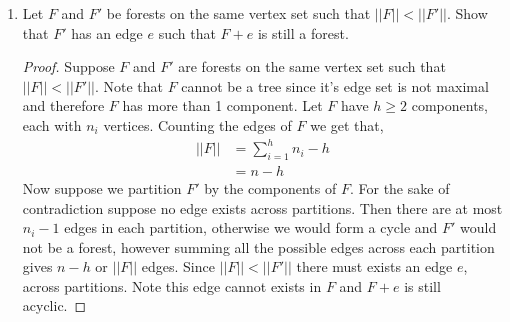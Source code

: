 \documentclass[12pt]{article}
\begin{document}
\begin{enumerate}
	\begin{proof}$(b \to d)$ Suppose any two vertices of $T$ are linked by a unique path. Let $x, y \in V(T)$ are non-adjacent and $P$ the unique path with which they are connected. Consider an edge $e$ incident to $x$ and $y$. Note $P + e$ will form a cycle in $T$, hence $T$ is maximally connected. 
	\end{proof}


	\begin{proof}$(c \to a)$ Suppose $T$ is minimally connected.
		Suppose for the sake of contradiction that $T$ has a cycle. Removing an edge from the cycle would still result in a connected graph, a contradiction. Hence $T$ is a tree. 
	\end{proof}

	\begin{proof}$(d \to a)$ Suppose $T$ is maximally acyclic.
		Suppose for the sake of contradiction that $T$ is disconnected. Then there exists at least two acyclic components, and connecting them via an edge would not produce a cycle, a contradiction. Hence $T$ is a tree. 
	\end{proof}






	\vspace{.5in}


	\item Let $F$ and $F'$ be forests on the same vertex set such that $||F||< ||F'||$. Show that $F'$ has an edge $e$ such that $F + e$ is still a forest.\\ 
	\begin{proof} Suppose $F$ and $F'$ are forests on the same vertex set such that $||F||< ||F'||$. Note that $F$ cannot be a tree since it's edge set is not maximal and therefore $F$ has more than 1 component. Let $F$ have $h \geq 2$ components, each with $n_i$ vertices. 
		Counting the edges of $F$ we get that, 
		\begin{align*}
			||F|| &= \sum_{i = 1}^h n_i  - h\\
			&= n - h
		\end{align*}
		Now suppose we partition $F'$ by the components of $F$. For the sake of contradiction suppose no edge exists across partitions. Then there are at most $n_i - 1$ edges in each partition, otherwise we would form a cycle and $F'$ would not be a forest, however summing all the possible edges across each partition gives $n - h$ or $||F||$ edges. Since $||F||< ||F'||$ there must exists an edge $e$, across partitions. Note this edge cannot exists in $F$ and $F + e$ is still acyclic. 
	\end{proof} 
	\vspace{.5in}

	

\end{enumerate}
\end{document}
